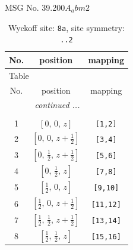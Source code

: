 \documentclass[fleqn,8pt]{jsarticle}
\begin{document}
\setcounter{MaxMatrixCols}{32}

\renewcommand{\tablename}{Table~}
\renewcommand{\figurename}{Figure~}
\begin{center}
\LARGE
MSG No. 39.200\quad$A_{a}bm2$
\end{center}
\renewcommand{\arraystretch}{1.2}
\begin{longtable}{ccc}
\caption{Wyckoff site: {\tt 8a}, site symmetry: {\tt ..2}}
 \\
 \hline \hline
No. & position & mapping \\ \hline \endfirsthead

\multicolumn{2}{l}{\tablename\ \thetable{}} \\
 \hline \hline
No. & position & mapping \\ \hline \endhead

 \hline \hline
\multicolumn{2}{r}{\footnotesize\it continued ...} \\ \endfoot

 \hline \hline
\multicolumn{2}{r}{} \\ \endlastfoot

1 & $\left[ 0,\, 0,\, z \right]$ & {\tt [1,2]} \\ \hline
2 & $\left[ 0,\, 0,\, z + \frac{1}{2} \right]$ & {\tt [3,4]} \\ \hline
3 & $\left[ 0,\, \frac{1}{2},\, z + \frac{1}{2} \right]$ & {\tt [5,6]} \\ \hline
4 & $\left[ 0,\, \frac{1}{2},\, z \right]$ & {\tt [7,8]} \\ \hline
5 & $\left[ \frac{1}{2},\, 0,\, z \right]$ & {\tt [9,10]} \\ \hline
6 & $\left[ \frac{1}{2},\, 0,\, z + \frac{1}{2} \right]$ & {\tt [11,12]} \\ \hline
7 & $\left[ \frac{1}{2},\, \frac{1}{2},\, z + \frac{1}{2} \right]$ & {\tt [13,14]} \\ \hline
8 & $\left[ \frac{1}{2},\, \frac{1}{2},\, z \right]$ & {\tt [15,16]} \\
\end{longtable}
\renewcommand{\arraystretch}{1.2}
\end{document}
